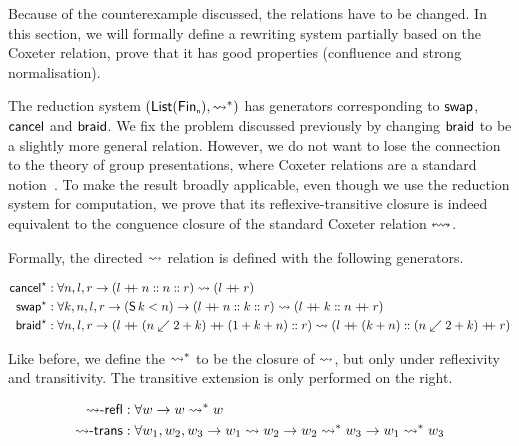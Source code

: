 Because of the counterexample discussed, the relations have to be changed. In this section, we will formally define a
rewriting system partially based on the Coxeter relation, prove that it has good properties (confluence and strong
normalisation).

The reduction system $(\List[\Fin[n]], \longcox*)$ has generators corresponding to $\swap$, $\cancel$ and $\braid$. We
fix the problem discussed previously by changing $\braid$ to be a slightly more general relation. However, we do not
want to lose the connection to the theory of group presentations, where Coxeter relations are a standard
notion~. To make the result broadly applicable, even though we use the reduction system for computation,
we prove that its reflexive-transitive closure is indeed equivalent to the conguence closure of the standard Coxeter
relation $\cox$.


Formally, the directed $\longcox$ relation is defined with the following generators.

\begin{definition}[$\longcox$]
  \begin{align*}
    \longcancel
     & : \forall n, l, r \to (l \append n \cons n \cons r) \longcox (l \append r)                                                                   \\
    \longswap
     & : \forall k, n, l, r \to (\suc[k] < n) \to (l \append n \cons k \cons r) \longcox (l \append k \cons n \append r)                            \\
    \longbraid
     & : \forall n, l, r \to (l \append (n \downf 2 + k) \append (1 + k + n) \cons r) \longcox (l \append (k + n) \cons (n \downf 2 + k) \append r) \\
  \end{align*}
\end{definition}

Like before, we define the $\longcox*$ to be the closure of $\longcox$, but only under reflexivity and transitivity. The
transitive extension is only performed on the right.

\begin{definition}[$\longcox*$]
  \begin{align*}
    \reflr{\longcox}
     & : \forall w \to w \longcox* w                                                                               \\
    \transr{\longcox}
     & : \forall w_{1}, w_{2}, w_{3} \to  w_{1} \longcox w_{2} \to w_{2} \longcox* w_{3} \to w_{1} \longcox* w_{3} \\
  \end{align*}
\end{definition}

